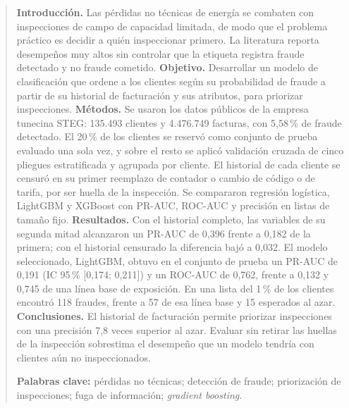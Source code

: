 \begin{abstract}
\noindent\textbf{Introducción.} Las pérdidas no técnicas de energía se combaten con
inspecciones de campo de capacidad limitada, de modo que el problema práctico es decidir a
quién inspeccionar primero. La literatura reporta desempeños muy altos sin controlar que la
etiqueta registra fraude detectado y no fraude cometido.
\textbf{Objetivo.} Desarrollar un modelo de clasificación que ordene a los clientes según su
probabilidad de fraude a partir de su historial de facturación y sus atributos, para
priorizar inspecciones.
\textbf{Métodos.} Se usaron los datos públicos de la empresa tunecina STEG: 135.493 clientes
y 4.476.749 facturas, con 5,58\,\% de fraude detectado. El 20\,\% de los clientes se reservó
como conjunto de prueba evaluado una sola vez, y sobre el resto se aplicó validación cruzada
de cinco pliegues estratificada y agrupada por cliente. El historial de cada cliente se
censuró en su primer reemplazo de contador o cambio de código o de tarifa, por ser huella de
la inspección. Se compararon regresión logística, LightGBM y XGBoost con PR-AUC, ROC-AUC y
precisión en listas de tamaño fijo.
\textbf{Resultados.} Con el historial completo, las variables de su segunda mitad alcanzaron
un PR-AUC de 0,396 frente a 0,182 de la primera; con el historial censurado la diferencia
bajó a 0,032. El modelo seleccionado, LightGBM, obtuvo en el conjunto de prueba un PR-AUC de
0,191 (IC 95\,\% [0,174; 0,211]) y un ROC-AUC de 0,762, frente a 0,132 y 0,745 de una línea
base de exposición. En una lista del 1\,\% de los clientes encontró 118 fraudes, frente a 57
de esa línea base y 15 esperados al azar.
\textbf{Conclusiones.} El historial de facturación permite priorizar inspecciones con una
precisión 7,8 veces superior al azar. Evaluar sin retirar las huellas de la inspección
sobrestima el desempeño que un modelo tendría con clientes aún no inspeccionados.

\medskip\noindent\textbf{Palabras clave:} pérdidas no técnicas; detección de fraude;
priorización de inspecciones; fuga de información; \textit{gradient boosting}.
\end{abstract}
